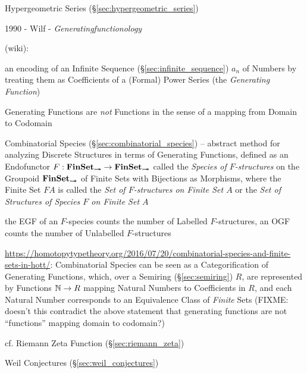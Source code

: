 Hypergeometric Series (\S\ref{sec:hypergeometric_series})

1990 - Wilf - \emph{Generatingfunctionology}

(wiki):

an encoding of an Infinite Sequence (\S\ref{sec:infinite_sequence}) $a_n$ of
Numbers by treating them as Coefficients of a (Formal) Power Series (the
\emph{Generating Function})

Generating Functions are \emph{not} Functions in the sense of a mapping from
Domain to Codomain

\fist Combinatorial Species (\S\ref{sec:combinatorial_species}) -- abstract
method for analyzing Discrete Structures in terms of Generating Functions,
defined as an Endofunctor $F : \mathbf{FinSet}_{\rightarrowtail\hspace{-8pt}\twoheadrightarrow} \rightarrow
\mathbf{FinSet}_{\rightarrowtail\hspace{-8pt}\twoheadrightarrow}$ called the \emph{Species of $F$-structures} on the
Groupoid $\mathbf{FinSet}_{\rightarrowtail\hspace{-8pt}\twoheadrightarrow}$ of Finite Sets with Bijections as Morphisms,
where the Finite Set $F A$ is called the \emph{Set of $F$-structures on Finite
  Set $A$} or the \emph{Set of Structures of Species $F$ on Finite Set $A$}

the EGF of an $F$-species counts the number of Labelled $F$-structures, an OGF
counts the number of Unlabelled $F$-structures

\url{https://homotopytypetheory.org/2016/07/20/combinatorial-species-and-finite-sets-in-hott/}:
Combinatorial Species can be seen as a Categorification of Generating Functions,
which, over a Semiring (\S\ref{sec:semiring}) $R$, are represented by Functions
$\mathbb{N} \rightarrow R$ mapping Natural Numbers to Coefficients in $R$, and each
Natural Number corresponds to an Equivalence Class of \emph{Finite} Sets
(FIXME: doesn't this contradict the above statement that generating functions
are not ``functions'' mapping domain to codomain?)

\fist cf. Riemann Zeta Function (\S\ref{sec:riemann_zeta})

\fist Weil Conjectures (\S\ref{sec:weil_conjectures})

